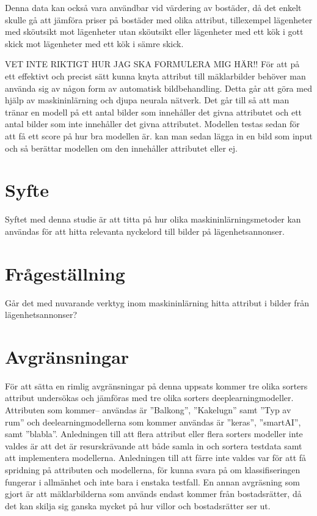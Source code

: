 \documentclass{kththesis}
\begin{document}
Denna data kan också vara användbar vid värdering av bostäder, då det enkelt skulle gå att jämföra priser på bostäder med olika attribut, tillexempel lägenheter med sköutsikt mot lägenheter utan sköutsikt eller lägenheter med ett kök i gott skick mot lägenheter med ett kök i sämre skick.

VET INTE RIKTIGT HUR JAG SKA FORMULERA MIG HÄR!!
För att på ett effektivt och precist sätt kunna knyta attribut till mäklarbilder behöver man använda sig av någon form av automatisk bildbehandling.
Detta går att göra med hjälp av maskininlärning och djupa neurala nätverk.
Det går till så att man tränar en modell på ett antal bilder som innehåller det givna attributet och ett antal bilder som inte innehåller det givna attributet.
Modellen testas sedan för att få ett score på hur bra modellen är.
 kan man sedan lägga in en bild som input och så berättar modellen om den innehåller attributet eller ej.
 



  \section{Syfte}
  Syftet med denna studie är att titta på hur olika maskininlärningsmetoder kan användas för att hitta relevanta nyckelord till bilder på lägenhetsannonser. 
  

  \section{Frågeställning}
  Går det med nuvarande verktyg inom maskininlärning hitta attribut i bilder från lägenhetsannonser?


  \section{Avgränsningar}
  För att sätta en rimlig avgränsningar på denna uppsats kommer tre olika sorters attribut undersökas och jämföras med tre olika sorters deeplearningmodeller. 
  Attributen som kommer– användas är ”Balkong”, ”Kakelugn” samt ”Typ av rum” och deelearningmodellerna som kommer användas är ”keras”, ”smartAI”, samt ”blabla”. 
  Anledningen till att flera attribut eller flera sorters modeller inte valdes är att det är resurskrävande att både samla in och sortera testdata samt att implementera modellerna. 
  Anledningen till att färre inte valdes var för att få spridning på attributen och modellerna, för kunna svara på om klassifiseringen fungerar i allmänhet och inte bara i enstaka testfall. 
  En annan avgräsning som gjort är att mäklarbilderna som används endast kommer från bostadsrätter, då det kan skilja sig ganska mycket på hur villor och bostadsrätter ser ut.
\end{document}
